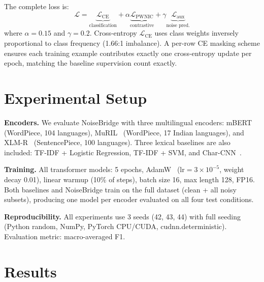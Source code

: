 \documentclass[conference]{IEEEtran}
\begin{document}
The complete loss is:
\begin{equation}
\mathcal{L} = \underbrace{\mathcal{L}_\text{CE}}_{\text{classification}}
+ \alpha \underbrace{\mathcal{L}_{\text{PWNIC}}}_{\text{contrastive}}
+ \gamma \underbrace{\mathcal{L}_\text{aux}}_{\text{noise pred.}}
\label{eq:total}
\end{equation}
where $\alpha = 0.15$ and $\gamma = 0.2$. Cross-entropy $\mathcal{L}_\text{CE}$ uses class weights inversely proportional to class frequency (1.66:1 imbalance). A per-row CE masking scheme ensures each training example contributes exactly one cross-entropy update per epoch, matching the baseline supervision count exactly.

\section{Experimental Setup}
\label{sec:experiments}

\textbf{Encoders.} We evaluate NoiseBridge with three multilingual encoders: mBERT~\cite{devlin2019bert} (WordPiece, 104 languages), MuRIL~\cite{khanuja2021muril} (WordPiece, 17 Indian languages), and XLM-R~\cite{conneau2020xlmr} (SentencePiece, 100 languages). Three lexical baselines are also included: TF-IDF + Logistic Regression, TF-IDF + SVM, and Char-CNN~\cite{zhang2015character}.

\textbf{Training.} All transformer models: 5 epochs, AdamW~\cite{loshchilov2019decoupled} ($\text{lr} = 3 \times 10^{-5}$, weight decay 0.01), linear warmup (10\% of steps), batch size 16, max length 128, FP16. Both baselines and NoiseBridge train on the full dataset (clean + all noisy subsets), producing one model per encoder evaluated on all four test conditions.

\textbf{Reproducibility.} All experiments use 3 seeds (42, 43, 44) with full seeding (Python random, NumPy, PyTorch CPU/CUDA, cudnn.deterministic). Evaluation metric: macro-averaged F1.

\section{Results}
\label{sec:results}
\end{document}
